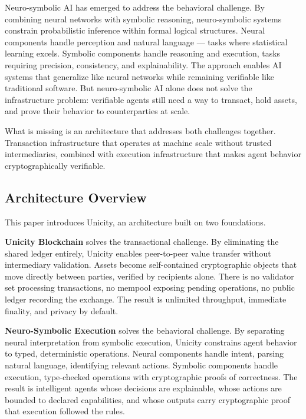 \documentclass{article}
\begin{document}
\medskip

Neuro-symbolic AI has emerged to address the behavioral challenge. By combining neural networks with symbolic reasoning, neuro-symbolic systems constrain probabilistic inference within formal logical structures. Neural components handle perception and natural language --- tasks where statistical learning excels. Symbolic components handle reasoning and execution, tasks requiring precision, consistency, and explainability. The approach enables AI systems that generalize like neural networks while remaining verifiable like traditional software. But neuro-symbolic AI alone does not solve the infrastructure problem: verifiable agents still need a way to transact, hold assets, and prove their behavior to counterparties at scale.

\medskip

What is missing is an architecture that addresses both challenges together. Transaction infrastructure that operates at machine scale without trusted intermediaries, combined with execution infrastructure that makes agent behavior cryptographically verifiable.

\subsection*{Architecture Overview}

This paper introduces Unicity, an architecture built on two foundations.

\medskip

\textbf{Unicity Blockchain} solves the transactional challenge. By eliminating the shared ledger entirely, Unicity enables peer-to-peer value transfer without intermediary validation. Assets become self-contained cryptographic objects that move directly between parties, verified by recipients alone. There is no validator set processing transactions, no mempool exposing pending operations, no public ledger recording the exchange. The result is unlimited throughput, immediate finality, and privacy by default.

\medskip

\textbf{Neuro-Symbolic Execution} solves the behavioral challenge. By separating neural interpretation from symbolic execution, Unicity constrains agent behavior to typed, deterministic operations. Neural components handle intent, parsing natural language, identifying relevant actions. Symbolic components handle execution, type-checked operations with cryptographic proofs of correctness. The result is intelligent agents whose decisions are explainable, whose actions are bounded to declared capabilities, and whose outputs carry cryptographic proof that execution followed the rules.
\end{document}
